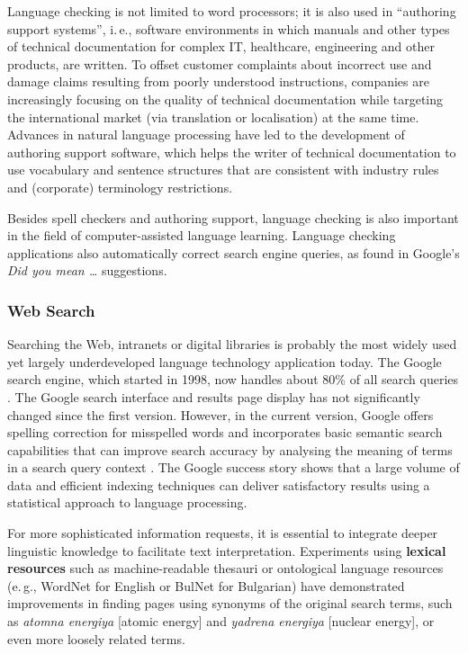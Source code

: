 \documentclass[]{../../metanetpaper}
\begin{document}
\begin{multicols}{2}
Language checking is not limited to word processors; it is also used in “authoring support systems”, i.\,e., software environments in which manuals and other types of technical documentation for complex IT, healthcare, engineering and other products, are written. To offset customer complaints about incorrect use and damage claims resulting from poorly understood instructions, companies are increasingly focusing on the quality of technical documentation while targeting the international market (via translation or localisation) at the same time. Advances in natural language processing have led to the development of authoring support software, which helps the writer of technical documentation to use vocabulary and sentence structures that are consistent with industry rules and (corporate) terminology restrictions.


Besides spell checkers and authoring support, language checking is also important in the field of computer-assisted language learning. 
Language checking applications also automatically correct search engine queries, as found in Google's \textit{Did you mean \dots} suggestions.

\subsubsection{Web Search}

Searching the Web, intranets or digital libraries is probably the most widely used yet largely underdeveloped language technology application today. The Google search engine, which started in 1998, now handles about 80\% of all search queries \cite{spi1}. 
The Google search interface and results page display has not significantly changed since the first version. However, in the current version, Google offers spelling correction for misspelled words and incorporates basic semantic search capabilities that can improve search accuracy by analysing the meaning of terms in a search query context \cite{pc1}. The Google success story shows that a large volume of data and efficient indexing techniques can deliver satisfactory results using a statistical approach to language processing. 

For more sophisticated information requests, it is essential to integrate deeper linguistic knowledge to facilitate text interpretation. Experiments using \textbf{lexical resources} such as machine-readable thesauri or ontological language resources (e.\,g., WordNet for English or BulNet for Bulgarian) have demonstrated improvements in finding pages using synonyms of the original search terms, such as {\it atomna energiya} [atomic energy] and {\it yadrena energiya} [nuclear energy], or even more loosely related terms. 


\end{multicols}
\end{document}
